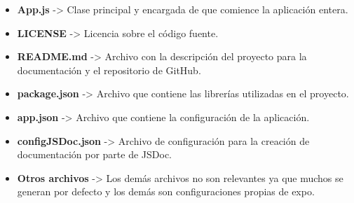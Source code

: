 \documentclass[11pt]{report}
\begin{document}
\begin{itemize}
	\item \textbf{App.js} -> Clase principal y encargada de que comience la aplicación entera.
	\item \textbf{LICENSE} -> Licencia sobre el código fuente.
	\item \textbf{README.md} -> Archivo con la descripción del proyecto para la documentación y el repositorio de GitHub.
	\item \textbf{package.json} -> Archivo que contiene las librerías utilizadas en el proyecto.
	\item \textbf{app.json} -> Archivo que contiene la configuración de la aplicación.
	\item \textbf{configJSDoc.json} -> Archivo de configuración para la creación de documentación por parte de JSDoc.
	\item \textbf{Otros archivos} -> Los demás archivos no son relevantes ya que muchos se generan por defecto y los demás son configuraciones propias de expo.
\end{itemize}

\newpage
\nocite{*} %
 


\newpage
\end{document}
